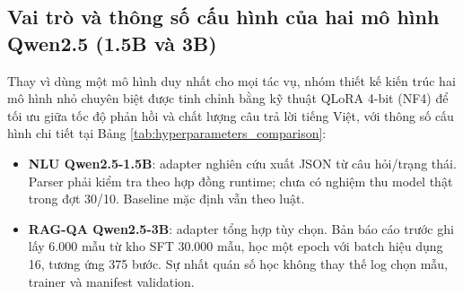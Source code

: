 \subsection{Vai trò và thông số cấu hình của hai mô hình Qwen2.5 (1.5B và 3B)}

Thay vì dùng một mô hình duy nhất cho mọi tác vụ, nhóm thiết kế kiến trúc hai mô hình nhỏ chuyên biệt được tinh chỉnh bằng kỹ thuật QLoRA 4-bit (NF4) để tối ưu giữa tốc độ phản hồi và chất lượng câu trả lời tiếng Việt, với thông số cấu hình chi tiết tại Bảng \ref{tab:hyperparameters_comparison}:
\begin{itemize}[nosep]
  \item \textbf{NLU Qwen2.5-1.5B}: adapter nghiên cứu xuất JSON từ câu hỏi/trạng thái. Parser phải kiểm tra theo hợp đồng runtime; chưa có nghiệm thu model thật trong đợt 30/10. Baseline mặc định vẫn theo luật.
  \item \textbf{RAG-QA Qwen2.5-3B}: adapter tổng hợp tùy chọn. Bản báo cáo trước ghi lấy 6.000 mẫu từ kho SFT 30.000 mẫu, học một epoch với batch hiệu dụng 16, tương ứng 375 bước. Sự nhất quán số học không thay thế log chọn mẫu, trainer và manifest validation.
\end{itemize}

